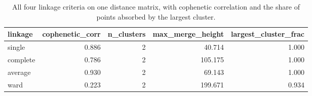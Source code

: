 \begin{table}[htbp]
\centering
\begin{tabular}{lrrrr}
\toprule
linkage & cophenetic\_corr & n\_clusters & max\_merge\_height & largest\_cluster\_frac \\
\midrule
single & 0.886 & 2 & 40.714 & 1.000 \\
complete & 0.786 & 2 & 105.175 & 1.000 \\
average & 0.930 & 2 & 69.143 & 1.000 \\
ward & 0.223 & 2 & 199.671 & 0.934 \\
\bottomrule
\end{tabular}
\caption{All four linkage criteria on one distance matrix, with cophenetic correlation and the share of points absorbed by the largest cluster.}
\label{tab:linkage}
\end{table}
